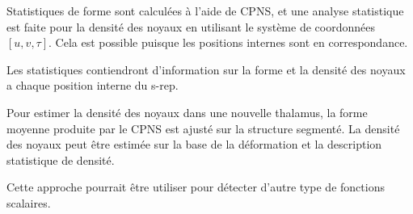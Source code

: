 Statistiques de forme sont calculées à l'aide de CPNS,
et une analyse statistique est faite pour
la densité des noyaux en utilisant le système de coordonnées $[u, v, \tau]$.
Cela est possible puisque les positions internes sont en correspondance.

Les statistiques contiendront d'information sur la forme et la densité des noyaux  
a chaque position interne du s-rep.

Pour estimer la densité des noyaux dans une nouvelle thalamus,
la forme moyenne produite par le CPNS est ajusté sur la structure segmenté.
La densité des noyaux peut être estimée sur la base
de la déformation et la description statistique de densité.

Cette approche pourrait être utiliser pour détecter d'autre type de fonctions scalaires.

